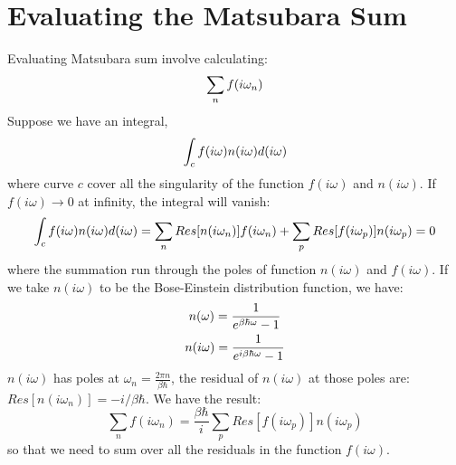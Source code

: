 \documentclass{article}
\begin{document}
\section{Evaluating the Matsubara Sum}
Evaluating Matsubara sum involve calculating:
\begin{equation}
    \sum_n f(i\omega_n) \notag
\end{equation}
Suppose we have an integral,
\begin{equation}
    \int_c f(i\omega) n(i\omega) d(i\omega) \notag
\end{equation}
where curve $c$ cover all the singularity of the function $f(i\omega)$ and $n(i\omega)$.
If $f(i\omega) \to 0$ at infinity, the integral will vanish:
\begin{equation}
    \int_c f(i\omega) n(i\omega) d(i\omega) = \sum_n Res[n(i\omega_n)] f(i\omega_n) + \sum_p Res[f(i\omega_p)] n(i\omega_p) = 0 \notag
\end{equation}
where the summation run through the poles of function $n(i\omega)$ and $f(i\omega)$. 
If we take $n(i\omega)$ to be the Bose-Einstein distribution function, we have:
\begin{gather}
    n(\omega) = \frac{1}{e^{\beta\hbar\omega} - 1} \notag \\
    n(i\omega) = \frac{1}{e^{i\beta\hbar\omega} - 1} \notag
\end{gather}
$n(i\omega)$ has poles at $\omega_n = \frac{2\pi n}{\beta\hbar}$, the residual of $n(i\omega)$ at those poles 
are: $Res[n(i\omega_n)] = -i/\beta\hbar$. We have the result:
\begin{equation}
    \sum_n f(i\omega_n) = \frac{\beta\hbar}{i} \sum_{p} Res[f(i\omega_p)] n(i\omega_p)
\end{equation}
so that we need to sum over all the residuals in the function $f(i\omega)$.
\end{document}
